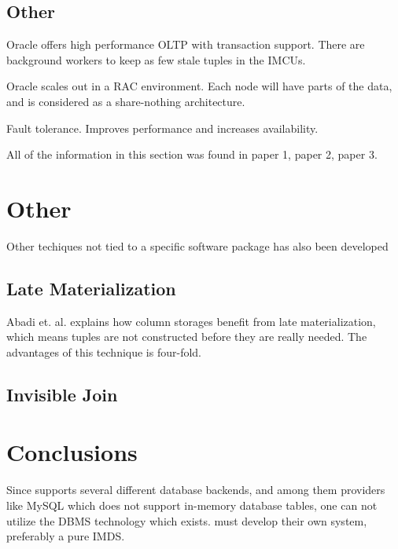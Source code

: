 \subsection{Other}
\label{sub:Other}
Oracle offers high performance OLTP with transaction support. There are background workers to keep as few stale tuples in the IMCUs.

Oracle scales out in a RAC environment. Each node will have parts of the data, and is considered as a share-nothing architecture.

Fault tolerance. Improves performance and increases availability.

All of the information in this section was found in paper 1, paper 2, paper 3.

\section{Other}
\label{sec:Other}
Other techiques not tied to a specific software package has also been developed

\subsection{Late Materialization}
\label{sub:Late Materialization}
Abadi et. al. \cite{Abadi2008-dd} explains how column storages benefit from late materialization, which means tuples are not constructed before they are really needed. The advantages of this technique is four-fold. 

\subsection{Invisible Join}
\label{sub:Invisible Join}
\section{Conclusions}
\label{sec:Conclusions}
Since \genusSoftware supports several different database backends, and among them providers like MySQL which does not support in-memory database tables, one can not utilize the DBMS technology which exists. \genus must develop their own system, preferably a pure IMDS.
